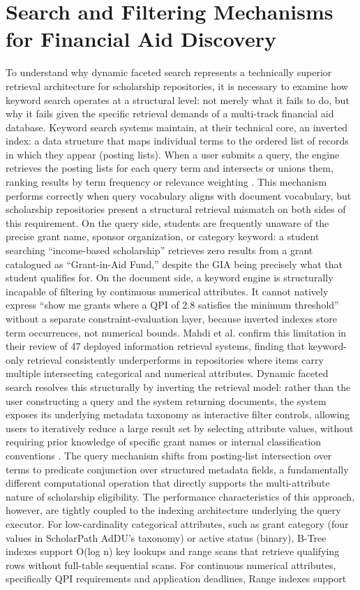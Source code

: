 \section{Search and Filtering Mechanisms for Financial Aid Discovery}

To understand why dynamic faceted search represents a technically superior retrieval architecture for scholarship repositories, it is necessary to examine how keyword search operates at a structural level: not merely what it fails to do, but why it fails given the specific retrieval demands of a multi-track financial aid database. Keyword search systems maintain, at their technical core, an inverted index: a data structure that maps individual terms to the ordered list of records in which they appear (posting lists). When a user submits a query, the engine retrieves the posting lists for each query term and intersects or unions them, ranking results by term frequency or relevance weighting \cite{ref43}. This mechanism performs correctly when query vocabulary aligns with document vocabulary, but scholarship repositories present a structural retrieval mismatch on both sides of this requirement. On the query side, students are frequently unaware of the precise grant name, sponsor organization, or category keyword: a student searching ``income-based scholarship'' retrieves zero results from a grant catalogued as ``Grant-in-Aid Fund,'' despite the GIA being precisely what that student qualifies for. On the document side, a keyword engine is structurally incapable of filtering by continuous numerical attributes. It cannot natively express ``show me grants where a QPI of 2.8 satisfies the minimum threshold'' without a separate constraint-evaluation layer, because inverted indexes store term occurrences, not numerical bounds. Mahdi et al. \cite{ref4} confirm this limitation in their review of 47 deployed information retrieval systems, finding that keyword-only retrieval consistently underperforms in repositories where items carry multiple intersecting categorical and numerical attributes. Dynamic faceted search resolves this structurally by inverting the retrieval model: rather than the user constructing a query and the system returning documents, the system exposes its underlying metadata taxonomy as interactive filter controls, allowing users to iteratively reduce a large result set by selecting attribute values, without requiring prior knowledge of specific grant names or internal classification conventions \cite{ref43}. The query mechanism shifts from posting-list intersection over terms to predicate conjunction over structured metadata fields, a fundamentally different computational operation that directly supports the multi-attribute nature of scholarship eligibility. The performance characteristics of this approach, however, are tightly coupled to the indexing architecture underlying the query executor. For low-cardinality categorical attributes, such as grant category (four values in ScholarPath AdDU's taxonomy) or active status (binary), B-Tree indexes support O(log n) key lookups and range scans that retrieve qualifying rows without full-table sequential scans. For continuous numerical attributes, specifically QPI requirements and application deadlines, Range indexes support 